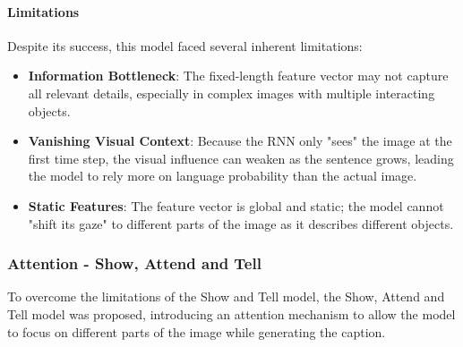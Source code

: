 \paragraph{Limitations}
Despite its success, this model faced several inherent limitations:
\begin{itemize}
    \item \textbf{Information Bottleneck}: The fixed-length feature vector may not capture all relevant details, especially in complex images with multiple interacting objects.
    \item \textbf{Vanishing Visual Context}: Because the RNN only "sees" the image at the first time step, the visual influence can weaken as the sentence grows, leading the model to rely more on language probability than the actual image.
    \item \textbf{Static Features}: The feature vector is global and static; the model cannot "shift its gaze" to different parts of the image as it describes different objects.
\end{itemize}

\subsubsection{Attention - Show, Attend and Tell}
To overcome the limitations of the Show and Tell model, the Show, Attend and Tell model was proposed, introducing an attention mechanism 
to allow the model to focus on different parts of the image while generating the caption.

